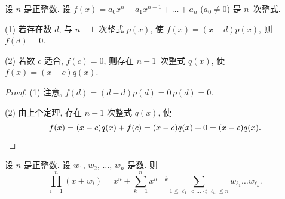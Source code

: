 \documentclass[../libro.tex]{subfiles}
\begin{document}
\begin{theorem}
    设 \(n\) 是正整数.
    设 \(f(x) = a_0 x^n + a_1 x^{n-1} + \dots + a_n\)
    (\(a_0 \neq 0\)) 是 \(n\)~次整式.

    (1)
    若存在数 \(d\), 与 \(n-1\)~次整式 \(p(x)\),
    使 \(f(x) = (x - d) p(x)\),
    则 \(f(d) = 0\).

    (2)
    若数 \(c\) 适合, \(f(c) = 0\),
    则存在 \(n-1\)~次整式 \(q(x)\),
    使 \(f(x) = (x - c) q(x)\).
\end{theorem}

\begin{proof}
    (1)
    注意, \(f(d) = (d - d) p(d) = 0\, p(d) = 0\).

    (2)
    由上个定理, 存在 \(n-1\) 次整式 \(q(x)\), 使
    \begin{equation*}
        f(x) = (x - c) q(x) + f(c)
        = (x - c) q(x) + 0
        = (x - c) q(x).
        \qedhere
    \end{equation*}
\end{proof}

\begin{theorem}
    设 \(n\) 是正整数.
    设 \(w_1\), \(w_2\), \(\dots\), \(w_n\) 是数.
    则
    \begin{equation}
        \prod_{i = 1}^{n} {(x + w_i)}
        = x^n + \sum_{k = 1}^{n} {x^{n-k}
            \sum_{1 \leq \ell_1 < \dots < \ell_k \leq n}
            {w_{\ell_1} \dots w_{\ell_k}}
        }.
        \label{eq:Viète}
    \end{equation}
\end{theorem}
\end{document}
